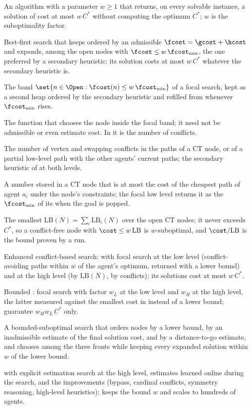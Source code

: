\item[Bounded-suboptimal algorithm] An algorithm with a parameter $w\ge1$ that returns, on every solvable instance, a solution of cost at most $w\,C^*$ without computing the optimum $C^*$; $w$ is the suboptimality factor.
\item[Focal search ($\astar_\eps$)] Best-first search that keeps \Open ordered by an admissible $\fcost=\gcost+\hcost$ and expands, among the open nodes with $\fcost\le w\,\fcost_{\min}$, the one preferred by a secondary heuristic; its solution costs at most $w\,C^*$ whatever the secondary heuristic is.
\item[FOCAL list] The band $\set{n\in\Open:\fcost(n)\le w\,\fcost_{\min}}$ of a focal search, kept as a second heap ordered by the secondary heuristic and refilled from \Open whenever $\fcost_{\min}$ rises.
\item[Secondary heuristic $\hcost_{\Focal}$] The function that chooses the node inside the focal band; it need not be admissible or even estimate cost. In \ecbs it is the number of conflicts.
\item[Conflict heuristic $h_c$] The number of vertex and swapping conflicts in the paths of a CT node, or of a partial low-level path with the other agents' current paths; the secondary heuristic of \ecbs at both levels.
\item[Per-agent lower bound $\mathrm{LB}_i(N)$] A number stored in a CT node that is at most the cost of the cheapest path of agent $a_i$ under the node's constraints; the focal low level returns it as the $\fcost_{\min}$ of its \Open when the goal is popped.
\item[Global lower bound $\mathrm{LB}$] The smallest $\mathrm{LB}(N)=\sum_i\mathrm{LB}_i(N)$ over the open CT nodes; it never exceeds $C^*$, so a conflict-free node with $\cost\le w\,\mathrm{LB}$ is $w$-suboptimal, and $\cost/\mathrm{LB}$ is the bound proven by a run.
\item[ECBS] Enhanced conflict-based search: \cbs with focal search at the low level (conflict-avoiding paths within $w$ of the agent's optimum, returned with a lower bound) and at the high level (\Open by $\mathrm{LB}(N)$, \Focal by conflicts); its solutions cost at most $w\,C^*$.
\item[BCBS$(w_H,w_L)$] Bounded \cbs: focal search with factor $w_L$ at the low level and $w_H$ at the high level, the latter measured against the smallest cost in \Open instead of a lower bound; guarantee $w_Hw_L\,C^*$ only.
\item[Explicit estimation search (EES)] A bounded-suboptimal search that orders nodes by a lower bound, by an inadmissible estimate of the final solution cost, and by a distance-to-go estimate, and chooses among the three fronts while keeping every expanded solution within $w$ of the lower bound.
\item[EECBS] \ecbs with explicit estimation search at the high level, estimates learned online during the search, and the \cbs improvements (bypass, cardinal conflicts, symmetry reasoning, high-level heuristics); keeps the bound $w$ and scales to hundreds of agents.
